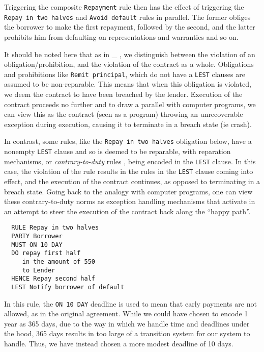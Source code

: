 \documentclass{article}
\begin{document}
Triggering the composite \texttt{Repayment} rule then has the effect of
triggering the \texttt{Repay in two halves} and \texttt{Avoid default}
rules in parallel.
The former obliges the borrower to make the first repayment, followed by the
second, and the latter prohibits him from defaulting on representations and
warranties and so on.

It should be noted here that as in \_
,
we distinguish between the violation of an obligation/prohibition, and the
violation of the contract as a whole.
Obligations and prohibitions like \texttt{Remit principal}, which do not have
a \texttt{LEST} clauses are assumed to be non-reparable.
This means that when this obligation is violated, we deem the contract to
have been breached by the lender.
Execution of the contract proceeds no further and to draw a parallel with
computer programs, we can view this as the contract (seen as a program)
throwing an unrecoverable exception during execution, causing it to terminate
in a breach state (ie crash).


In contrast, some rules, like the \texttt{Repay in two halves} obligation below,
have a nonempty \texttt{LEST} clause and so is deemed to be reparable, with
reparation mechanisms, or \textit{contrary-to-duty} rules
, being encoded in the
\texttt{LEST} clause.
In this case, the violation of the rule results in the rules in the
\texttt{LEST} clause coming into effect, and the execution of the contract
continues, as opposed to terminating in a breach state.
Going back to the analogy with computer programs, one can view these
contrary-to-duty norms as exception handling mechanisms that activate in an
attempt to steer the execution of the contract back along the ``happy path''.

\begin{lstlisting}
  RULE Repay in two halves
  PARTY	Borrower
  MUST ON 10 DAY
  DO repay first half
     in the amount of 550
     to Lender
  HENCE	Repay second half
  LEST Notify borrower of default
\end{lstlisting}

In this rule, the \texttt{ON 10 DAY} deadline is used to mean that early
payments are not allowed, as in the original agreement.
While we could have chosen to encode 1 year as 365 days, due to the way in which
we handle time and deadlines under the hood, 365 days results in too large of a
transition system for our system to handle.
Thus, we have instead chosen a more modest deadline of 10 days.
\end{document}

